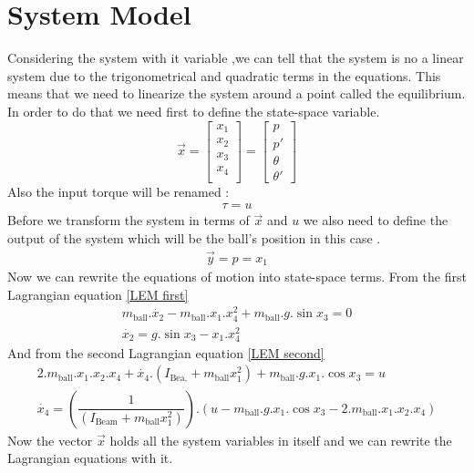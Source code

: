 \chapter{System Model}
Considering the system with it variable ,we can tell that the system is no a linear system due to the trigonometrical and quadratic terms in the equations.
This means that we need to linearize the system around a point called the equilibrium.
In order to do that we need first to define the state-space variable.
\begin{equation}
	\vec{x} =
	\begin{bmatrix}
		x_1 \\
		x_2 \\
		x_3 \\
		x_4 \\
	\end{bmatrix}=
	\begin{bmatrix}
		p \\
		p' \\
		\theta \\
		\theta '
	\end{bmatrix}
\end{equation}
Also the input torque will be renamed :
\begin{equation}
	\begin{split}
		\tau = u
	\end{split}
\end{equation}
Before we transform the system in terms of $\vec{x}$ and $u$ we also need to define the output of the system which will be the ball's position in this case .
\begin{equation}
	\begin{split}
		\vec{y} = p = x_1
	\end{split}
\end{equation}
Now we can rewrite the equations of motion into state-space terms.
From the first Lagrangian equation \eqref{LEM first}
\begin{equation}
	\begin{split}
		m_{\text{ball}}.\dot{x_2} -  m_{\text{ball}}.x_1.x_4^2 + m_{\text{ball}}.g.\sin{x_3} = 0 \\
		\dot{x_2} =  g.\sin{x_3} - x_1.x_4^2 
	\end{split}
\end{equation}
And from the second Lagrangian equation \eqref{LEM second}
\begin{equation}
	\begin{split}
		2.m_{\text{ball}}.x_1.x_2.x_4 + \dot{x_4}.(I_{\text{Bea,}} + m_{\text{ball}} x_1^2) + m_{\text{ball}}.g.x_1.\cos{x_3}  = u \\
		\dot{x_4} = (\dfrac{1}{(I_{\text{Beam}} + m_{\text{ball}} x_1^2)} ). (u - m_{\text{ball}}.g.x_1.\cos{x_3} - 2.m_{\text{ball}}.x_1.x_2.x_4 )
	\end{split}
\end{equation} 
Now the vector $\vec{x}$ holds all the system variables in itself and we can rewrite the Lagrangian equations with it.

